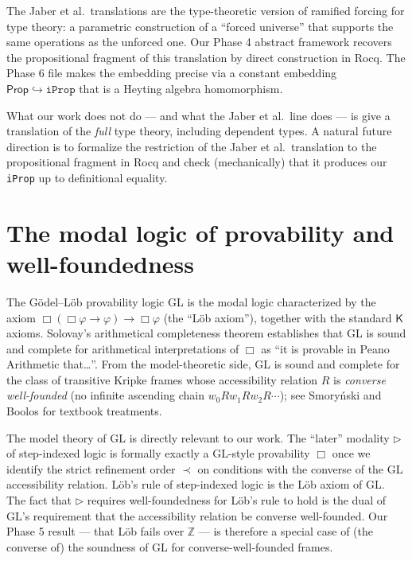 \documentclass[11pt]{article}
\begin{document}
The Jaber et al.\ translations are the type-theoretic version of
ramified forcing for type theory: a parametric construction of a
``forced universe'' that supports the same operations as the
unforced one. Our Phase 4 abstract framework recovers the
propositional fragment of this translation by direct construction in
Rocq. The Phase 6 file makes the embedding precise via a constant
embedding $\mathsf{Prop} \hookrightarrow \mathtt{iProp}$ that is
a Heyting algebra homomorphism.

What our work does not do --- and what the Jaber et al.\ line does ---
is give a translation of the \emph{full} type theory, including
dependent types. A natural future direction is to formalize the
restriction of the Jaber et al.\ translation to the propositional
fragment in Rocq and check (mechanically) that it produces our
\texttt{iProp} up to definitional equality.

\section{The modal logic of provability and well-foundedness}
\label{sec:gl}

The Gödel--Löb provability logic \textsf{GL} is the modal logic
characterized by the axiom $\Box(\Box \varphi \to \varphi) \to
\Box \varphi$ (the ``Löb axiom''), together with the standard
$\mathsf{K}$ axioms. Solovay's arithmetical completeness theorem
\cite{solovay1976} establishes that \textsf{GL} is sound and complete
for arithmetical interpretations of $\Box$ as ``it is provable in
Peano Arithmetic that\ldots''. From the model-theoretic side,
\textsf{GL} is sound and complete for the class of transitive
Kripke frames whose accessibility relation $R$ is
\emph{converse well-founded} (no infinite ascending chain
$w_0 R w_1 R w_2 R \cdots$); see Smoryński \cite{smorynski1985} and
Boolos \cite{boolos1993} for textbook treatments.

The model theory of \textsf{GL} is directly relevant to our work.
The ``later'' modality $\triangleright$ of step-indexed logic is
formally exactly a \textsf{GL}-style provability $\Box$ once we
identify the strict refinement order $\prec$ on conditions with the
converse of the \textsf{GL} accessibility relation. Löb's rule of
step-indexed logic is the Löb axiom of \textsf{GL}. The fact that
$\triangleright$ requires well-foundedness for Löb's rule to hold is
the dual of \textsf{GL}'s requirement that the accessibility relation
be converse well-founded. Our Phase 5 result --- that Löb fails over
$\mathbb{Z}$ --- is therefore a special case of (the converse of)
the soundness of \textsf{GL} for converse-well-founded frames.
\end{document}
